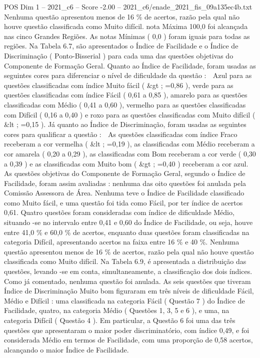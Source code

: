 \begin{textsample}{POS Dim 1 – 2021\_c6 – Score -2.00 – 2021\_c6/enade\_2021\_fis\_09a135ec4b.txt}
Nenhuma questão apresentou menos de 16 \% de acertos, razão pela qual não houve questão classificada como Muito difícil. nota Máxima 100,0 foi alcançada nas cinco Grandes Regiões.
As notas Mínimas ( 0,0 ) foram iguais para todas as regiões.
Na Tabela 6.7, são apresentados o Índice de Facilidade e o Índice de Discriminação ( Ponto-Bisserial ) para cada uma das questões objetivas do Componente de Formação Geral.
Quanto ao Índice de Facilidade, foram usadas as seguintes cores para diferenciar o nível de dificuldade da questão :  Azul para as questões classificadas com índice Muito fácil ( \&gt ; =0,86 ), verde para as questões classificadas com índice Fácil ( 0,61 a 0,85 ), amarelo para as questões classificadas com Médio ( 0,41 a 0,60 ), vermelho para as questões classificadas com Difícil ( 0,16 a 0,40 ) e roxo para as questões classificadas com Muito difícil ( \&lt ; =0,15 ).
Já quanto ao Índice de Discriminação, foram usadas as seguintes cores para qualificar a questão :  As questões classificadas com índice Fraco receberam a cor vermelha ( \&lt ; =0,19 ), as classificadas com Médio receberam a cor amarela ( 0,20 a 0,29 ), as classificadas com Bom receberam a cor verde ( 0,30 a 0,39 ) e as classificadas com Muito bom ( \&gt ; =0,40 ) receberam a cor azul.
As questões objetivas do Componente de Formação Geral, segundo o Índice de Facilidade, foram assim avaliadas : nenhuma das oito questões foi anulada pela Comissão Assessora de Área.
Nenhuma teve o Índice de Facilidade classificado como Muito fácil, e uma questão foi tida como Fácil, por ter índice de acertos 0,61.
Quatro questões foram consideradas com índice de dificuldade Médio, situando -se no intervalo entre 0,41 e 0,60 do Índice de Facilidade, ou seja, houve entre 41,0 \% e 60,0 \% de acertos, enquanto duas questões foram classificadas na categoria Difícil, apresentando acertos na faixa entre 16 \% e 40 \%.
Nenhuma questão apresentou menos de 16 \% de acertos, razão pela qual não houve questão classificada como Muito difícil.
Na Tabela 6.9, é apresentada a distribuição das questões, levando -se em conta, simultaneamente, a classificação dos dois índices.
Como já comentado, nenhuma questão foi anulada.
As seis questões que tiveram Índice de Discriminação Muito bom figuraram em três níveis de dificuldade Fácil, Médio e Difícil : uma classificada na categoria Fácil ( Questão 7 ) do Índice de Facilidade, quatro, na categoria Médio ( Questões 1, 3, 5 e 6 ), e uma, na categoria Difícil ( Questão 4 ).
Em particular, a Questão 6 foi uma das três questões que apresentaram o maior poder discriminatório, com índice 0,49, e foi considerada Médio em termos de Facilidade, com uma proporção de 0,58 acertos, alcançando o maior Índice de Facilidade.

\end{textsample}
